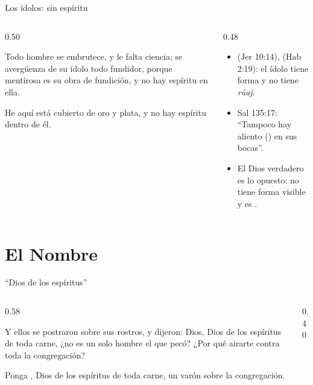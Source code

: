 \begin{frame}{Los ídolos: sin espíritu}
\begin{columns}[t,onlytextwidth]
\begin{column}{0.50\textwidth}
\begin{cita}Todo hombre se embrutece, y le falta ciencia; se avergüenza de su ídolo todo fundidor, porque mentirosa es su obra de fundición, y no hay espíritu en ella.\end{cita}
\begin{cita}He aquí está cubierto de oro y plata, y no hay espíritu dentro de él.\end{cita}
\end{column}
\begin{column}{0.48\textwidth}\small
\begin{itemize}
\item {} (Jer 10:14),  (Hab 2:19): el ídolo tiene forma y no tiene \emph{rúaj}.
\item Sal 135:17: ``Tampoco hay aliento () en sus bocas''.
\item El Dios verdadero es lo opuesto: no tiene forma visible y es .
\end{itemize}
\end{column}
\end{columns}
\end{frame}

\section{El Nombre}

\begin{frame}{``Dios de los espíritus''}
\begin{columns}[c,onlytextwidth]
\begin{column}{0.58\textwidth}
\begin{cita}Y ellos se postraron sobre sus rostros, y dijeron: Dios, Dios de los espíritus de toda carne, ¿no es un solo hombre el que pecó? ¿Por qué airarte contra toda la congregación?\end{cita}
\begin{cita}Ponga \SENOR, Dios de los espíritus de toda carne, un varón sobre la congregación.\end{cita}
\end{column}
\begin{column}{0.40\textwidth}\end{column}
\end{columns}
\end{frame}

